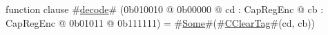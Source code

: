 function clause #\hyperref[zdecode]{decode}# (0b010010 @ 0b00000 @ cd : CapRegEnc @ cb : CapRegEnc @    0b01011 @ 0b111111) = #\hyperref[zSome]{Some}#(#\hyperref[zCClearTag]{CClearTag}#(cd, cb))
